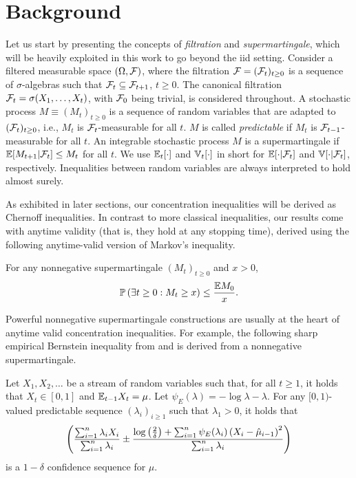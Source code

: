 \section{Background} \label{section:background}

Let us start by presenting the concepts of \textit{filtration} and \textit{supermartingale}, which will be heavily exploited in this work to go beyond the iid setting. Consider a filtered measurable space $(\Omega,\mathcal{F})$, where the filtration $\mathcal{F} = (\mathcal{F}_t)_{t \geq 0}$ is a sequence of $\sigma$-algebras such that $\mathcal{F}_t \subseteq \mathcal{F}_{t+1}$, $t \geq 0$. The canonical filtration $\mathcal{F}_t = \sigma(X_1, \ldots, X_t)$, with $\mathcal{F}_0$ being trivial, is considered throughout. A stochastic process $M \equiv (M_t)_{t \geq 0}$ is a sequence of random variables that are adapted to $(\mathcal{F}_t)_{t \geq 0}$, i.e., $M_t$ is $\mathcal{F}_{t}$-measurable for all $t$.  $M$ is called \emph{predictable} if $M_t$ is $\mathcal{F}_{t-1}$-measurable for all $t$. An integrable stochastic process $M$ is a supermartingale if $\mathbb{E}[M_{t+1}| \mathcal{F}_t] \leq M_t$ for all $t$.  We use  $\mathbb{E}_{t}[\cdot]$ and $\mathbb{V}_{t}[\cdot]$ in short for $\mathbb{E}[\cdot | \mathcal{F}_t]$ and $\mathbb{V}[\cdot | \mathcal{F}_t]$, respectively. Inequalities between random variables are always interpreted to hold almost surely. 

As exhibited in later sections, our concentration inequalities will be derived as Chernoff inequalities. In contrast to more classical inequalities, our results come with anytime validity (that is, they hold at any stopping time), derived using the following anytime-valid version of Markov's inequality. 
\begin{theorem}  \label{theorem:villesinequality}
    For any nonnegative supermartingale $(M_t)_{t \geq 0}$ and $x > 0$,
    \begin{align*}
        \mathbb{P} \left( \exists t \geq 0: M_t \geq x\right) \leq \frac{\mathbb{E} M_0}{x}.
    \end{align*}
\end{theorem}
Powerful nonnegative supermartingale constructions are usually at the heart of anytime valid concentration inequalities. For example, the following sharp empirical Bernstein inequality from \citet{howard2021time} and \citet{waudby2024estimating} is derived from a nonnegative supermartingale.

\begin{theorem} \label{theorem:empirical_bernstein_ian}
Let $X_1, X_2, \ldots$ be a stream of random variables such that, for all $t \geq 1$, it holds that $X_t \in [0, 1]$ and $\mathbb{E}_{t-1}X_t = \mu$. Let $\psi_E(\lambda) = -\log\lambda - \lambda$. For any $[0,1)$-valued predictable sequence $(\lambda_i)_{i \geq 1}$ such that $\lambda_1 > 0$, it holds that
    \begin{align*}
    \left( \frac{\sum_{i = 1}^n \lambda_i X_i}{\sum_{i = 1}^n \lambda_i} \pm  \frac{\log\left(\frac{2}{\delta}\right) + \sum_{i = 1}^n \psi_E(\lambda_i)  \left( X_i - \hat\mu_{i-1} \right)^2}{\sum_{i = 1}^n \lambda_i}\right)
\end{align*}
is a $1-\delta$ confidence sequence for $\mu$.
\end{theorem}

